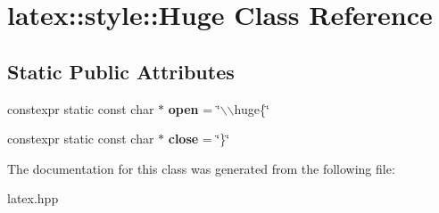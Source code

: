 \hypertarget{classlatex_1_1style_1_1Huge}{\section{latex\-:\-:style\-:\-:\-Huge \-Class \-Reference}
\label{classlatex_1_1style_1_1Huge}
}
\subsection*{\-Static \-Public \-Attributes}
\begin{DoxyCompactItemize}
\item 
\hypertarget{classlatex_1_1style_1_1Huge_aa51fea893411808973c2c0699b91cb23}{constexpr static const char $\ast$ {\bfseries open} = \char`\"{}$\backslash$$\backslash$huge\{\char`\"{}}\label{classlatex_1_1style_1_1Huge_aa51fea893411808973c2c0699b91cb23}

\item 
\hypertarget{classlatex_1_1style_1_1Huge_ad9abb5e698a0e3cfaeac3534a0376dc6}{constexpr static const char $\ast$ {\bfseries close} = \char`\"{}\}\char`\"{}}\label{classlatex_1_1style_1_1Huge_ad9abb5e698a0e3cfaeac3534a0376dc6}

\end{DoxyCompactItemize}


\-The documentation for this class was generated from the following file\-:\begin{DoxyCompactItemize}
\item 
latex.\-hpp\end{DoxyCompactItemize}
